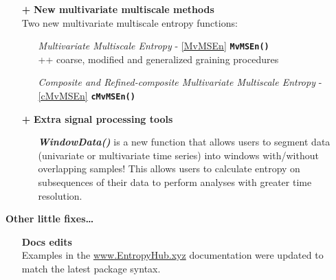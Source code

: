 \documentclass[12pt, a4paper, titlepage, openany]{book}
\begin{document}
\begin{itemize}
\item[\textbf{+}] \textbf{New multivariate multiscale methods}\\
Two new multivariate multiscale entropy functions:
\begin{itemize}
\item[] \textit{Multivariate Multiscale Entropy}   - \ref{MvMSEn} \hspace{15mm} \texttt{\textbf{MvMSEn()}}  \\
++ coarse, modified and generalized graining procedures  
\item[] \textit{Composite and Refined-composite Multivariate Multiscale Entropy}  - \ref{cMvMSEn} \hspace{3mm} \texttt{\textbf{cMvMSEn()}} 
\end{itemize}

\item[\textbf{+}] \textbf{Extra signal processing tools}
\begin{itemize}
\item[] \textit\textbf{{WindowData()}} is a new function that allows users to segment data (univariate or multivariate time series) into windows with/without overlapping samples! This allows users to calculate entropy on subsequences of their data to perform analyses with greater time resolution.
\end{itemize}
\end{itemize}

\noindent \textbf{Other little fixes…}
\begin{itemize}
\item[\checkmark] \textbf{Docs edits} \\
Examples in the \href{https://www.EntropyHub.xyz}{www.EntropyHub.xyz} documentation were updated to match the latest package syntax.
\end{itemize}
\end{document}
